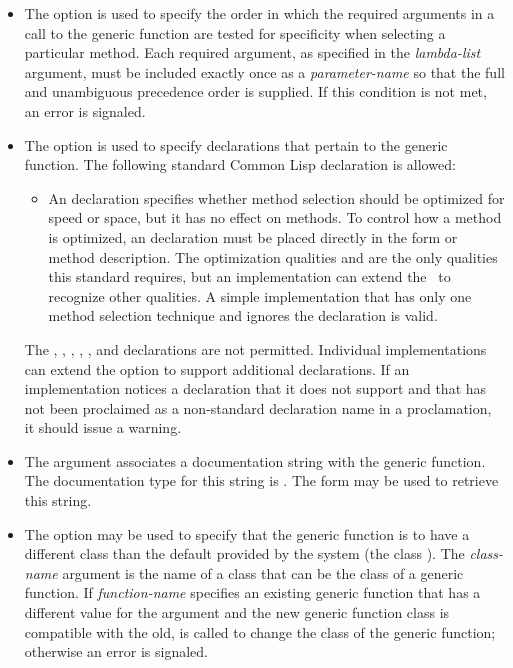 \begin{defmac}
\begin{itemize}
\item  
The  option is used to specify the
order in which the required arguments in a call to the generic
function are tested for specificity when selecting a particular
method.  Each required argument, as specified in the \emph{lambda-list\/}
argument, must be included exactly once as a {\it
parameter-name} so that the full and unambiguous precedence order is
supplied.  If this condition is not met, an error is signaled.

\item 
The  option is used to specify declarations that pertain
to the generic function.  The following standard Common Lisp
declaration is allowed:

\begin{itemize}
\item
An  declaration specifies whether method selection
should be optimized for speed or space, but it has no effect on
methods.  To control how a method is optimized, an 
declaration must be placed directly in the  form or
method description.  The optimization qualities  and 
 are the only qualities this standard requires, but an
implementation can extend the \CLOS\ to recognize other qualities.  A
simple implementation that has only one method selection technique and
ignores the  declaration is valid.
\end{itemize}

The , , , , 
, and  declarations are not permitted.
Individual implementations can extend the  option to
support additional declarations.  If an implementation notices a
declaration that it does not support and that has not been proclaimed
as a non-standard declaration name in a  proclamation, it
should issue a warning.

\item  
The  argument associates a documentation string
with the generic function.  The documentation type for this string is
.  The form  may be used to retrieve this
string.

\item  
The  option may be used to specify that
the generic function is to have a different class than the default
provided by the system (the class ).
The \emph{class-name\/} argument is the name of a class that can be the
class of a generic function.  If \emph{function-name\/} specifies
an existing generic function that has a different value for the 
 argument and the new generic function class
is compatible with the old,  is called to change the
class of the generic function; otherwise an error is signaled.


\end{itemize}
\end{defmac}
